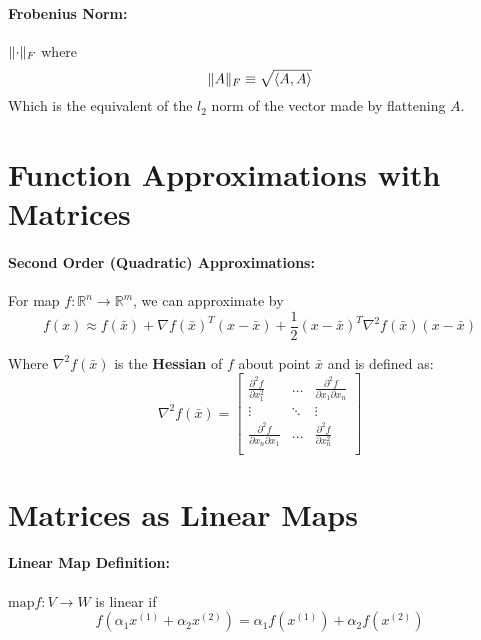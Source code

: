 \documentclass[a4paper,12pt]{report}
\DeclarePairedDelimiter\norm{\lVert}{\rVert}%
\DeclarePairedDelimiter\inpr{\langle}{\rangle}%
\def\reals{\mathbb{R}}
\begin{document}
\paragraph{Frobenius Norm: } $\norm{\cdot}_F$ where
\begin{equation}
\norm{A}_F \equiv \sqrt{\inpr{A,A}}
\end{equation}
Which is the equivalent of the $l_2$ norm of the vector made by flattening $A$.



\section{Function Approximations with Matrices}

\paragraph{Second Order (Quadratic) Approximations: } For map $f:\reals^n\to \reals^m$, we can approximate by
\begin{equation}
f(x)\approx f(\bar{x}) + \nabla f(\bar{x})^T (x-\bar{x}) + \frac{1}{2} (x-\bar{x})^T \nabla^2 f(\bar{x}) (x-\bar{x})
\end{equation}

Where $\nabla^2 f(\bar{x})$ is the \textbf{Hessian} of $f$ about point $\bar{x}$ and is defined as: 
\begin{equation}
\nabla^2 f(\bar{x}) = 
\begin{bmatrix}
\frac{\partial^2 f}{\partial x_1^2} & \dots & \frac{\partial^2 f}{\partial x_1\partial x_n} \\
\vdots & \ddots & \vdots \\
\frac{\partial^2 f}{\partial x_n\partial x_1} & \dots & \frac{\partial^2 f}{\partial x_n^2} \\
\end{bmatrix}
\end{equation}

\section{Matrices as Linear Maps}

\paragraph{Linear Map Definition: } $\text{map} f:V\to W$ is linear if
\begin{equation}
	f(\alpha_1 x^{(1)} + \alpha_2 x^{(2)} ) = \alpha_1 f(x^{(1)}) + \alpha_2 f(x^{(2)})
\end{equation}
\end{document}
